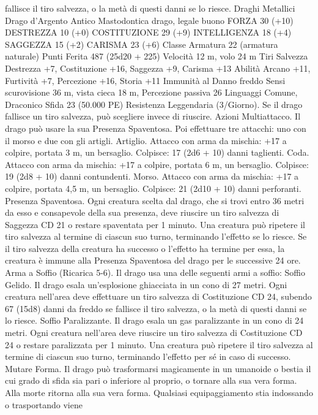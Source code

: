 \begin{multicols}{2}
fallisce il tiro salvezza, o la metà di questi danni se lo riesce.
Draghi Metallici
Drago d’Argento Antico
Mastodontica drago, legale buono
FORZA 30 (+10)
DESTREZZA 10 (+0)
COSTITUZIONE 29 (+9)
INTELLIGENZA 18 (+4)
SAGGEZZA 15 (+2)
CARISMA 23 (+6)
Classe Armatura 22 (armatura naturale)
Punti Ferita 487 (25d20 + 225)
Velocità 12 m, volo 24 m
Tiri Salvezza Destrezza +7, Costituzione +16, Saggezza +9,
Carisma +13
Abilità Arcano +11, Furtività +7, Percezione +16, Storia +11
Immunità al Danno freddo
Sensi scurovisione 36 m, vista cieca 18 m, Percezione passiva 26
Linguaggi Comune, Draconico
Sfida 23 (50.000 PE)
Resistenza Leggendaria (3/Giorno). Se il drago fallisce un tiro
salvezza, può scegliere invece di riuscire.
Azioni
Multiattacco. Il drago può usare la sua Presenza Spaventosa. Poi
effettuare tre attacchi: uno con il morso e due con gli artigli.
Artiglio. Attacco con arma da mischia: +17 a colpire, portata 3
m, un bersaglio.
Colpisce: 17 (2d6 + 10) danni taglienti.
Coda. Attacco con arma da mischia: +17 a colpire, portata 6 m,
un bersaglio.
Colpisce: 19 (2d8 + 10) danni contundenti.
Morso. Attacco con arma da mischia: +17 a colpire, portata 4,5
m, un bersaglio.
Colpisce: 21 (2d10 + 10) danni perforanti.
Presenza Spaventosa. Ogni creatura scelta dal drago, che si trovi
entro 36 metri da esso e consapevole della sua presenza, deve
riuscire un tiro salvezza di Saggezza CD 21 o restare spaventata per
1 minuto. Una creatura può ripetere il tiro salvezza al termine di
ciascun suo turno, terminando l’effetto se lo riesce. Se il tiro salvezza
della creatura ha successo o l’effetto ha termine per essa, la creatura è
immune alla Presenza Spaventosa del drago per le successive 24 ore.
Arma a Soffio (Ricarica 5-6). Il drago usa una delle seguenti armi
a soffio:
Soffio Gelido. Il drago esala un’esplosione ghiacciata in un cono di
27 metri. Ogni creatura nell’area deve effettuare un tiro salvezza di
Costituzione CD 24, subendo 67 (15d8) danni da freddo se fallisce il
tiro salvezza, o la metà di questi danni se lo riesce.
Soffio Paralizzante. Il drago esala un gas paralizzante in un cono di
24 metri. Ogni creatura nell’area deve riuscire un tiro salvezza di
Costituzione CD 24 o restare paralizzata per 1 minuto. Una creatura
può ripetere il tiro salvezza al termine di ciascun suo turno,
terminando l’effetto per sé in caso di successo.
Mutare Forma. Il drago può trasformarsi magicamente in un
umanoide o bestia il cui grado di sfida sia pari o inferiore al proprio,
o tornare alla sua vera forma. Alla morte ritorna alla sua vera forma.
Qualsiasi equipaggiamento stia indossando o trasportando viene

\end{multicols}
